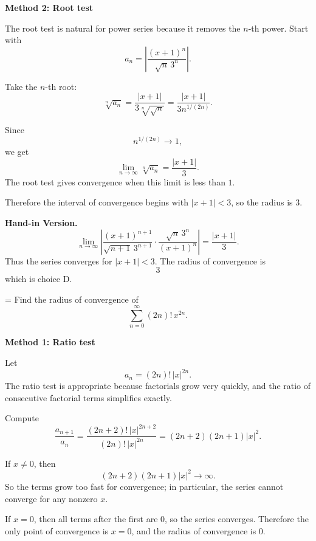 \documentclass[a4paper,12pt,twocolumn]{article}
\newlength{\problemnumberwidth}
\newenvironment{solutionbox}{\begin{framed}}{\end{framed}}
\newcommand{\problem}[3]{%
  \Needspace{10\baselineskip}%
  \phantomsection\label{#1}%
  \par\vspace{0.8em}%
  \noindent
  \hangindent=\problemnumberwidth
  \hangafter=1
  \makebox[\problemnumberwidth][l]{\textbf{#2.}}#3\par
}
\begin{document}
\begin{solutionbox}
\textbf{Method 2: Root test}

\begin{steps}
\item The root test is natural for power series because it removes the \(n\)-th power. Start with
\[
a_n=\left|\frac{(x+1)^n}{\sqrt n\,3^n}\right|.
\]

\item Take the \(n\)-th root:
\[
\sqrt[n]{a_n}
=\frac{|x+1|}{3\sqrt[n]{\sqrt n}}
=\frac{|x+1|}{3n^{1/(2n)}}.
\]

\item Since
\[
n^{1/(2n)}\to 1,
\]
we get
\[
\lim_{n\to\infty}\sqrt[n]{a_n}
=\frac{|x+1|}{3}.
\]
The root test gives convergence when this limit is less than \(1\).

\item Therefore the interval of convergence begins with \(|x+1|<3\), so the radius is \(3\).
\end{steps}

\textbf{Hand-in Version.}
\[
\lim_{n\to\infty}
\left|
\frac{(x+1)^{n+1}}{\sqrt{n+1}\,3^{n+1}}
\cdot
\frac{\sqrt n\,3^n}{(x+1)^n}
\right|
=\frac{|x+1|}{3}.
\]
Thus the series converges for \(|x+1|<3\). The radius of convergence is
\[
\boxed{3}
\]
which is choice \(\boxed{\text{D}}\).
\end{solutionbox}

\problem{prob:vii}{vii}{Find the radius of convergence of
\[
\sum_{n=0}^{\infty}(2n)!\,x^{2n}.
\]}

\begin{solutionbox}
\textbf{Method 1: Ratio test}

\begin{steps}
\item Let
\[
a_n=(2n)!\,|x|^{2n}.
\]
The ratio test is appropriate because factorials grow very quickly, and the ratio of consecutive factorial terms simplifies exactly.

\item Compute
\[
\frac{a_{n+1}}{a_n}
=\frac{(2n+2)!\,|x|^{2n+2}}{(2n)!\,|x|^{2n}}
=(2n+2)(2n+1)|x|^2.
\]

\item If \(x\ne0\), then
\[
(2n+2)(2n+1)|x|^2\to\infty.
\]
So the terms grow too fast for convergence; in particular, the series cannot converge for any nonzero \(x\).

\item If \(x=0\), then all terms after the first are \(0\), so the series converges. Therefore the only point of convergence is \(x=0\), and the radius of convergence is \(0\).
\end{steps}
\end{solutionbox}
\end{document}

